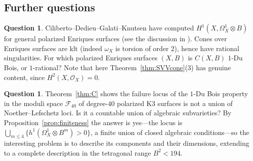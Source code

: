 \documentclass[11pt]{amsart}
\numberwithin{equation}{section}
\theoremstyle{plain}
\theoremstyle{definition}
\newtheorem{question}[theorem]{Question}
\theoremstyle{remark}
\newcommand{\cO}{\mathcal{O}}
\begin{document}
\subsection{Further questions}

\begin{question}
Ciliberto--Dedieu--Galati--Knutsen have computed $H^1(X,\Omega^1_X\otimes B)$ for general polarized Enriques surfaces \cite{CDGK} (see the discussion in \cite[\S3]{Tot}).
Cones over Enriques surfaces are klt (indeed $\omega_X$ is torsion of order $2$), hence have rational singularities.
For which polarized Enriques surfaces $(X,B)$ is $C(X,B)$ $1$-Du Bois, or $1$-rational?
Note that here Theorem~\ref{thm:SVVcone}(3) has genuine content, since $H^2(X,\cO_X)=0$.
\end{question}

\begin{question}
Theorem~\ref{thm:C} shows the failure locus of the $1$-Du Bois property in the moduli space $\mathcal{F}_{40}$ of degree-$40$ polarized K3 surfaces is not a union of Noether--Lefschetz loci.
Is it a countable union of algebraic subvarieties? By Proposition~\ref{prop:finiteness} the answer is yes---the locus is
$\bigcup_{m\le4}\{h^1(\Omega^1_X\otimes B^m)>0\}$, a finite union of closed algebraic conditions---so the interesting problem is to describe its components and their dimensions, extending \cite[Thm.~6.1, 6.2]{Tot} to a complete description in the tetragonal range $B^2<194$.
\end{question}
\end{document}
